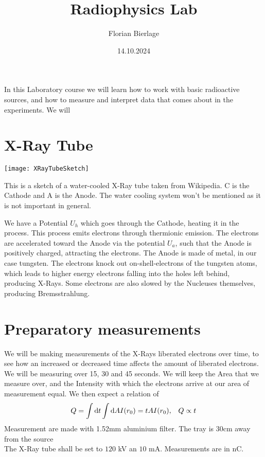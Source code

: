 \documentclass[]{scrartcl}
\title{Radiophysics Lab}
\author{Florian Bierlage}
\date{14.10.2024}
\begin{document}
\maketitle
\newpage
\tableofcontents
\newpage

In this Laboratory course we will learn how to work with basic radioactive sources, and how to measure and interpret data that comes about in the experiments. We will 


\section{X-Ray Tube}

\begin{centering}
	\texttt{[image: XRayTubeSketch]}
\end{centering}
This is a sketch of a water-cooled X-Ray tube taken from Wikipedia. C is the Cathode and A is the Anode. The water cooling system won't be mentioned as it is not important in general.

We have a Potential $U_h$ which goes through the Cathode, heating it in the process. This process emits electrons through thermionic emission. 
The electrons are accelerated toward the Anode via the potential $U_a$, such that the Anode is positively charged, attracting the electrons. The Anode is made of metal, in our case tungsten.
The electrons knock out on-shell-electrons of the tungsten atoms, which leads to higher energy electrons falling into the holes left behind, producing X-Rays. Some electrons are also slowed by the Nucleuses themselves, producing Bremsstrahlung.
\section{Preparatory measurements}

We will be making measurements of the X-Rays liberated electrons over time, to see how an increased or decreased time affects the amount of liberated electrons. We will be measuring over 15, 30 and 45 seconds. We will keep the Area that we measure over, and the Intensity with which the electrons arrive at our area of measurement equal. We then expect a relation of
\begin{equation}
	Q = \int \text dt\int \text dA I(r_0) = tAI(r_0),\;\;\; Q \propto t
\end{equation}
Measurement are made with 1.52mm aluminium filter. The tray is 30cm away from the source\\
The X-Ray tube shall be set to $120$ kV an $10$ mA. Measurements are in nC.
\end{document}

